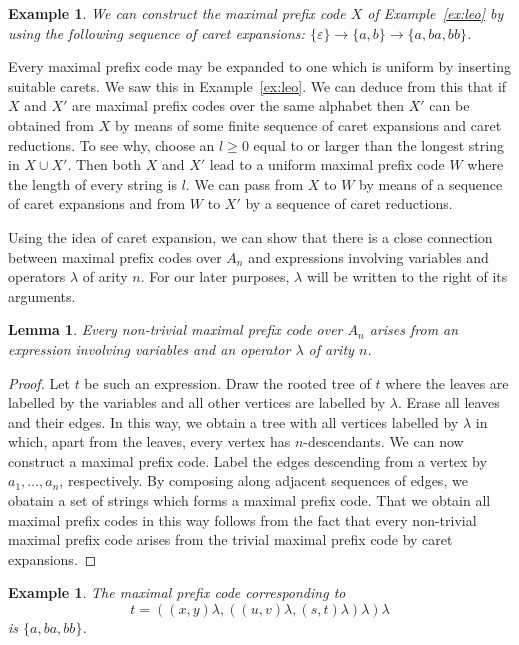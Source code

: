 \documentclass[a4paper]{amsart}
\newtheorem{lemma}[theorem]{Lemma}
\newtheorem{example}[theorem]{Example}
\begin{document}
\begin{example}\label{ex:taurus}
{\em We can construct the maximal prefix code $X$ of Example~\ref{ex:leo}
by using the following sequence of caret expansions:
$\{\varepsilon \} \rightarrow \{a,b\} \rightarrow \{a,ba,bb\}$. 
}
\end{example}

Every maximal prefix code may be expanded to one which is uniform
by inserting suitable carets.
We saw this in Example~\ref{ex:leo}.
We can deduce from this that if $X$ and $X'$ are maximal prefix codes over the same alphabet
then $X'$ can be obtained from $X$ by means of some finite sequence of caret expansions and caret reductions.
To see why, choose an $l \geq 0$ equal to or larger than the longest string in $X \cup X'$.
Then both $X$ and $X'$ lead to a uniform maximal prefix code $W$ where the length of every string is $l$.
We can pass from $X$ to $W$ by means of a sequence of caret expansions and from $W$ to $X'$ by a sequence of caret reductions. 

Using the idea of caret expansion, 
we can show that there is a close connection between maximal prefix codes over $A_{n}$ and expressions involving variables and operators $\lambda$ of arity $n$.
For our later purposes, $\lambda$ will be written to the right of its arguments. 

\begin{lemma}\label{lem:max-pc}
Every non-trivial maximal prefix code over $A_{n}$ arises from 
an expression involving variables and an operator $\lambda$ of arity $n$.
\end{lemma}
\begin{proof}
Let $t$ be such an expression.
Draw the rooted tree of $t$ where the leaves are labelled by the variables
and all other vertices are labelled by $\lambda$.
Erase all leaves and their edges.
In this way, we obtain a tree with all vertices labelled by $\lambda$
in which, apart from the leaves, every vertex has $n$-descendants.
We can now construct a maximal prefix code. 
Label the edges descending from a vertex by $a_{1}, \ldots, a_{n}$, respectively. 
By composing along adjacent sequences of edges, we obatain a set of strings
which forms a maximal prefix code.
That we obtain all maximal prefix codes in this way
follows from the fact that every non-trivial maximal prefix code arises
from the trivial maximal prefix code by caret expansions.
\end{proof}



\begin{example}{\em The maximal prefix code corresponding to
$$t = ((x,y)\lambda, ((u,v)\lambda, (s,t)\lambda)\lambda)\lambda$$ 
is
$\{a,ba,bb\}$.
}
\end{example}
\end{document}
